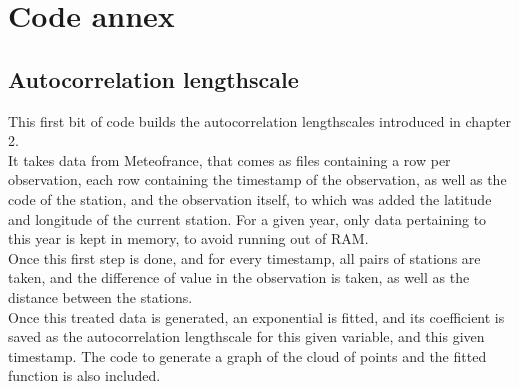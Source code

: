 \renewcommand{\thesection}{\arabic{chapter}.\arabic{section}}

\chapter*{Code annex}
\label{chap:code}
\cleardoublepage
\doublespacing

\section*{Autocorrelation lengthscale}

This first bit of code builds the autocorrelation lengthscales introduced in chapter 2.\\

It takes data from Meteofrance, that comes as files containing a row per observation, each row containing the timestamp of the observation, as well as the code of the station, and the observation itself, to which was added the latitude and longitude of the current station. For a given year, only data pertaining to this year is kept in memory, to avoid running out of RAM. \\

Once this first step is done, and for every timestamp, all pairs of stations are taken, and the difference of value in the observation is taken, as well as the distance between the stations. \\

Once this treated data is generated, an exponential is fitted, and its coefficient is saved as the autocorrelation lengthscale for this given variable, and this given timestamp. The code to generate a graph of the cloud of points and the fitted function is also included.\\



